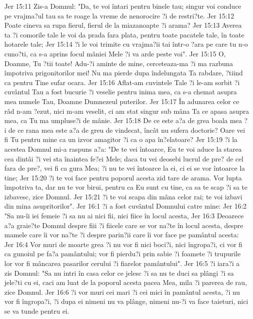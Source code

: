 Jer 15:11  Zis-a Domnul: "Da, te voi întari pentru binele tau; singur voi conduce pe vrajma?ul tau sa te roage la vreme de nenorocire ?i de restri?te.
Jer 15:12  Poate cineva sa rupa fierul, fierul de la miazanoapte ?i arama?
Jer 15:13  Averea ta ?i comorile tale le voi da prada fara plata, pentru toate pacatele tale, în toate hotarele tale;
Jer 15:14  ?i le voi trimite cu vrajma?ii tai într-o ?ara pe care tu n-o cuno?ti, ca s-a aprins focul mâniei Mele ?i va arde peste voi".
Jer 15:15  O, Doamne, Tu ?tii toate! Adu-?i aminte de mine, cerceteaza-ma ?i ma razbuna împotriva prigonitorilor mei! Nu ma pierde dupa îndelungata Ta rabdare, ?tiind ca pentru Tine sufar ocara.
Jer 15:16  Aflat-am cuvintele Tale ?i le-am sorbit ?i cuvântul Tau a fost bucurie ?i veselie pentru inima mea, ca s-a chemat asupra mea numele Tau, Doamne Dumnezeul puterilor.
Jer 15:17  În adunarea celor ce râd n-am ?ezut, nici m-am veselit, ci am stat singur sub mâna Ta ce apasa asupra mea, ca Tu ma umpluse?i de mânie.
Jer 15:18  De ce este a?a de grea boala mea ?i de ce rana mea este a?a de greu de vindecat, încât nu sufera doctorie? Oare vei fi Tu pentru mine ca un izvor amagitor ?i ca o apa în?elatoare?
Jer 15:19  ?i la acestea Domnul mi-a raspuns a?a: "De te vei întoarce, Eu te voi aduce la starea cea dintâi ?i vei sta înaintea fe?ei Mele; daca tu vei deosebi lucrul de pre? de cel fara de pre?, vei fi ca gura Mea; ?i nu te vei întoarce la ei, ci ei se vor întoarce la tine;
Jer 15:20  ?i te voi face pentru poporul acesta zid tare de arama. Vor lupta împotriva ta, dar nu te vor birui, pentru ca Eu sunt cu tine, ca sa te scap ?i sa te izbavesc, zice Domnul.
Jer 15:21  ?i te voi scapa din mâna celor rai; te voi izbavi din mina asupritorilor".
Jer 16:1  ?i a fost cuvântul Domnului catre mine:
Jer 16:2  "Sa nu-îi iei femeie ?i sa nu ai nici fii, nici fiice în locul acesta,
Jer 16:3  Deoarece a?a graie?te Domnul despre fiii ?i fiicele care se vor na?te în locul acesta, despre mamele care îi vor na?te ?i despre parin?ii care îi vor face pe pamântul acesta:
Jer 16:4  Vor muri de moarte grea ?i nu vor fi nici boci?i, nici îngropa?i, ci vor fi ca gunoiul pe fa?a pamântului; vor fi pierdu?i prin sabie ?i foamete ?i trupurile lor vor fi mâncarea pasarilor cerului ?i fiarelor pamântului".
Jer 16:5  ?i iara?i a zis Domnul: "Sa nu intri în casa celor ce jelesc ?i sa nu te duci sa plângi ?i sa jele?ti cu ei, caci am luat de la poporul acesta pacea Mea, mila ?i parerea de rau, zice Domnul.
Jer 16:6  ?i vor muri cei mari ?i cei mici în pamântul acesta, ?i nu vor fi îngropa?i, ?i dupa ei nimeni nu va plânge, nimeni nu-?i va face taieturi, nici se va tunde pentru ei.
